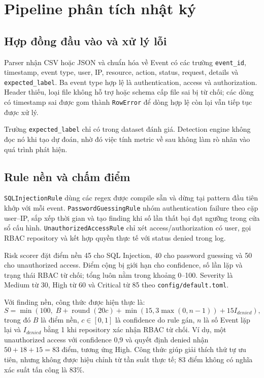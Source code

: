\chapter{Pipeline phân tích nhật ký}

\section{Hợp đồng đầu vào và xử lý lỗi}

Parser nhận CSV hoặc JSON và chuẩn hóa về Event có các trường
\texttt{event\_id}, timestamp, event type, user, IP, resource, action, status,
request, details và \texttt{expected\_label}. Ba event type hợp lệ là
authentication, access và authorization. Header thiếu, loại file không hỗ trợ
hoặc schema cấp file sai bị từ chối; các dòng có timestamp sai được gom thành
\texttt{RowError} để dòng hợp lệ còn lại vẫn tiếp tục được xử lý.

Trường \texttt{expected\_label} chỉ có trong dataset đánh giá. Detection engine
không đọc nó khi tạo dự đoán, nhờ đó việc tính metric về sau không làm rò nhãn
vào quá trình phát hiện.

\section{Rule nền và chấm điểm}

\texttt{SQLInjectionRule} dùng các regex được compile sẵn và dừng tại pattern
đầu tiên khớp với mỗi event. \texttt{PasswordGuessingRule} nhóm authentication
failure theo cặp user--IP, sắp xếp thời gian và tạo finding khi số lần thất bại
đạt ngưỡng trong cửa sổ cấu hình. \texttt{UnauthorizedAccessRule} chỉ xét
access/authorization có user, gọi RBAC repository và kết hợp quyền thực tế với
status denied trong log.

Risk scorer đặt điểm nền 45 cho SQL Injection, 40 cho password guessing và 50
cho unauthorized access. Điểm cộng bị giới hạn cho confidence, số lần lặp và
trạng thái RBAC từ chối; tổng luôn nằm trong khoảng 0--100. Severity là Medium
từ 30, High từ 60 và Critical từ 85 theo \texttt{config/default.toml}.

Với finding nền, công thức được hiện thực là:
\[
S=\min\left(100,\;B+\operatorname{round}(20c)
  +\min(15,3\max(0,n-1))+15I_{denied}\right),
\]
trong đó $B$ là điểm nền, $c\in[0,1]$ là confidence do rule gán, $n$ là số
Event lặp lại và $I_{denied}$ bằng 1 khi repository xác nhận RBAC từ chối.
Ví dụ, một unauthorized access với confidence 0,9 và quyết định denied nhận
$50+18+15=83$ điểm, tương ứng High. Công thức giúp giải thích thứ tự ưu tiên,
nhưng không được hiệu chỉnh từ tần suất thực tế; 83 điểm không có nghĩa xác
suất tấn công là 83\%.

